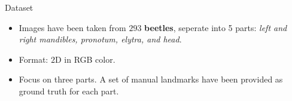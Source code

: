 \documentclass[10pt,svgnames]{beamer}
\begin{document}


\begin{frame}[c]{Dataset}
	\begin{itemize}
    	\item Images have been taken from $293$ \textbf{beetles}, seperate into 5 parts: \textit{left and right mandibles, pronotum, elytra, and head}.
    	\item Format: $2$D in RGB color.
    	\item Focus on three parts. A set of manual landmarks have been provided as ground truth for each part.
  	\end{itemize}
	

\end{frame}
\end{document}
